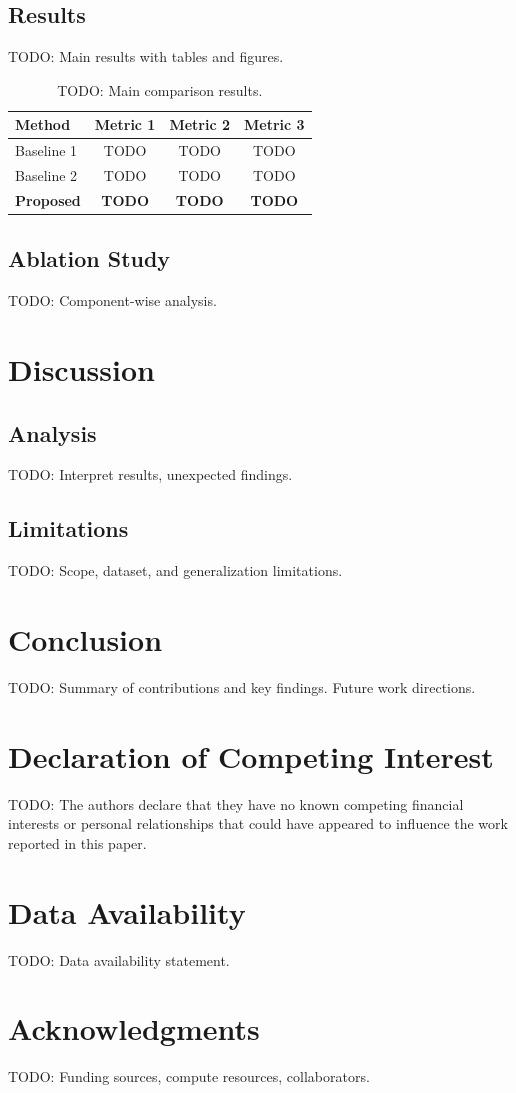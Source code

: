 \documentclass[preprint,12pt]{elsarticle}
\begin{document}
\subsection{Results}
TODO: Main results with tables and figures.

\begin{table}[htbp]
\caption{TODO: Main comparison results.}
\label{tab:main_results}
\centering
\begin{tabular}{lccc}
\toprule
Method & Metric 1 & Metric 2 & Metric 3 \\
\midrule
Baseline 1 & TODO & TODO & TODO \\
Baseline 2 & TODO & TODO & TODO \\
\textbf{Proposed} & \textbf{TODO} & \textbf{TODO} & \textbf{TODO} \\
\bottomrule
\end{tabular}
\end{table}

\subsection{Ablation Study}
TODO: Component-wise analysis.

\section{Discussion}
\label{sec:discussion}

\subsection{Analysis}
TODO: Interpret results, unexpected findings.

\subsection{Limitations}
TODO: Scope, dataset, and generalization limitations.

\section{Conclusion}
\label{sec:conclusion}
TODO: Summary of contributions and key findings. Future work directions.

\section*{Declaration of Competing Interest}
TODO: The authors declare that they have no known competing financial interests or personal relationships that could have appeared to influence the work reported in this paper.

\section*{Data Availability}
TODO: Data availability statement.

\section*{Acknowledgments}
TODO: Funding sources, compute resources, collaborators.



\end{document}
